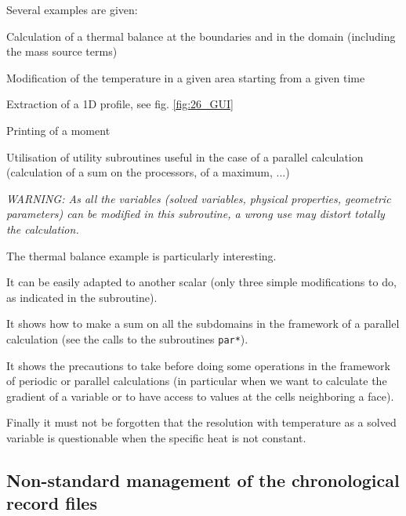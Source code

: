 {{{Several examples are given:
\begin{list}{-}{}
\item Calculation of a thermal balance at  the boundaries and in the
      domain (including the mass source terms)

\item Modification of the temperature in a given area starting from a
      given time

\item Extraction of a 1D profile, see fig. \ref{fig:26_GUI}

\item Printing of a moment

\item Utilisation of utility
      subroutines useful in the case of a parallel calculation
      (calculation of a sum on the processors, of a maximum, ...)
\end{list}

{\em WARNING: As all the variables (solved variables, physical
properties, geometric parameters) can be modified in this subroutine, a
wrong use may distort totally the calculation.}

The thermal balance example is particularly interesting.
\begin{list}{-}{}
\item It can be easily adapted to another scalar (only three simple
      modifications to do, as indicated in the subroutine).
\item It shows how to make a sum on all the subdomains in the framework
      of a parallel calculation (see the calls to the subroutines
      \texttt{par*}).
\item It shows the precautions to take before doing some operations in
      the framework of periodic or parallel calculations (in particular
      when we want to calculate the gradient of a variable or to have
      access to values at the cells neighboring a face).
\item Finally it must not be forgotten that the resolution with
      temperature as a solved variable is questionable when the specific
      heat is not constant.
\end{list}

\subsection{Non-standard management of the chronological record files}
\label{prg_ushist}

}}}

